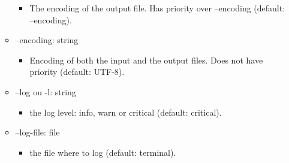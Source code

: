 \documentclass[manual-fr.tex]{subfiles}
\begin{document}
\begin{itemize}
\begin{itemize}
\begin{itemize}
                    \item[] The encoding of the output file. Has priority over --encoding (default: --encoding).
                \end{itemize}
            \item[] --encoding: string
                \begin{itemize}
                    \item[] Encoding of both the input and the output files. Does not have priority (default: UTF-8).
                \end{itemize}
            \item[] --log ou -l: string
                \begin{itemize}
                    \item[] the log level: info, warn or critical (default: critical).
                \end{itemize}
            \item[] --log-file: file
                \begin{itemize}
                    \item[] the file where to log (default: terminal).
                \end{itemize}
        \end{itemize}
\end{itemize}
\end{document}
